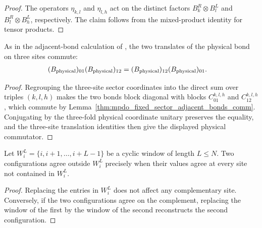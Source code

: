 \begin{proof}
    \leanok
    The operators $\eta_{k,l}$ and $\eta_{l,h}$ act on the distinct factors
    $B_k^R\otimes B_l^L$ and $B_l^R\otimes B_h^L$, respectively. The claim
    follows from the mixed-product identity for tensor products.
\end{proof}

\begin{lemma}
    \label{thm:mpdo_physical_adjacent_bonds_comm}
    \leanok
    As in the adjacent-bond calculation of
    \cite[Appendix~C.2, Proposition~C.8, lines~1589--1593]
    {Cirac2016MPDO_arXiv}, the two translates of the physical bond on three
    sites commute:
    \begin{align}
        (B_{\mathrm{physical}})_{01}(B_{\mathrm{physical}})_{12}
         & =(B_{\mathrm{physical}})_{12}(B_{\mathrm{physical}})_{01}.
        \notag
    \end{align}
\end{lemma}

\begin{proof}
    \leanok
    Regrouping the three-site sector coordinates into the direct sum over
    triples $(k,l,h)$ makes the two bonds block diagonal with blocks
    $C_{01}^{k,l,h}$ and $C_{12}^{k,l,h}$, which commute by
    Lemma~\ref{thm:mpdo_fixed_sector_adjacent_bonds_comm}. Conjugating by the
    three-fold physical coordinate unitary preserves the equality, and the
    three-site translation identities then give the displayed physical
    commutator.
\end{proof}

\begin{lemma}
    \label{thm:mpdo_agreement_outside_cyclic_window}
    \leanok
    Let $W_i^L=\{i,i+1,\ldots,i+L-1\}$ be a cyclic window of length
    $L\leq N$. Two configurations agree outside $W_i^L$ precisely when their
    values agree at every site not contained in $W_i^L$.
\end{lemma}

\begin{proof}\leanok
    Replacing the entries in $W_i^L$ does not affect any complementary site.
    Conversely, if the two configurations agree on the complement, replacing
    the window of the first by the window of the second reconstructs the
    second configuration.
\end{proof}

